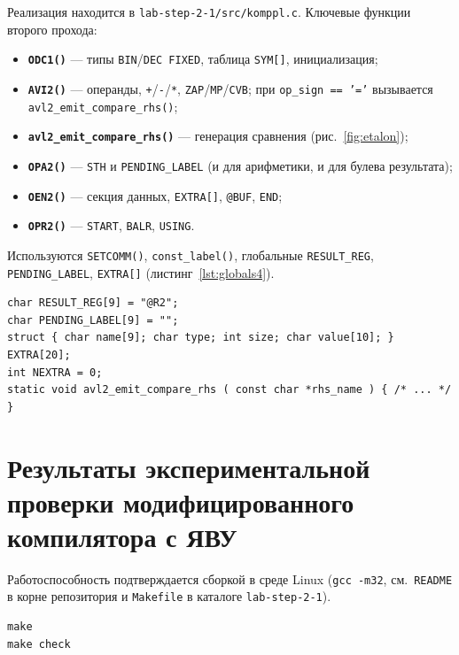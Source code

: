 \documentclass[a4paper,14pt]{extarticle}
\begin{document}
Реализация находится в \texttt{lab-step-2-1/src/komppl.c}. Ключевые функции второго прохода:

\begin{itemize}
  \item \textbf{\texttt{ODC1()}} --- типы \texttt{BIN}/\texttt{DEC FIXED}, таблица \texttt{SYM[]}, инициализация;
  \item \textbf{\texttt{AVI2()}} --- операнды, \texttt{+}/\texttt{-}/\texttt{*}, \texttt{ZAP}/\texttt{MP}/\texttt{CVB}; при \texttt{op\_sign == '='}
        вызывается \texttt{avl2\_emit\_compare\_rhs()};
  \item \textbf{\texttt{avl2\_emit\_compare\_rhs()}} --- генерация сравнения (рис.~\ref{fig:etalon});
  \item \textbf{\texttt{OPA2()}} --- \texttt{STH} и \texttt{PENDING\_LABEL} (и для арифметики, и для булева результата);
  \item \textbf{\texttt{OEN2()}} --- секция данных, \texttt{EXTRA[]}, \texttt{@BUF}, \texttt{END};
  \item \textbf{\texttt{OPR2()}} --- \texttt{START}, \texttt{BALR}, \texttt{USING}.
\end{itemize}

Используются \texttt{SETCOMM()}, \texttt{const\_label()}, глобальные \texttt{RESULT\_REG}, \texttt{PENDING\_LABEL}, \texttt{EXTRA[]}
(листинг~\ref{lst:globals4}).

\begin{lstlisting}[style=Cstyle,caption={Фрагмент \texttt{komppl.c}},label=lst:globals4]
char RESULT_REG[9] = "@R2";
char PENDING_LABEL[9] = "";
struct { char name[9]; char type; int size; char value[10]; } EXTRA[20];
int NEXTRA = 0;
static void avl2_emit_compare_rhs ( const char *rhs_name ) { /* ... */ }
\end{lstlisting}

\section{Результаты экспериментальной проверки модифицированного компилятора с ЯВУ}

Работоспособность подтверждается сборкой в среде Linux (\texttt{gcc~-m32}, см.\ \texttt{README} в корне репозитория и \texttt{Makefile}
в каталоге \texttt{lab-step-2-1}).

\begin{lstlisting}[style=ASMstyle,caption={Сборка и проверка (каталог \texttt{lab-step-2-1})},label=lst:build4]
make
make check
\end{lstlisting}
\end{document}

